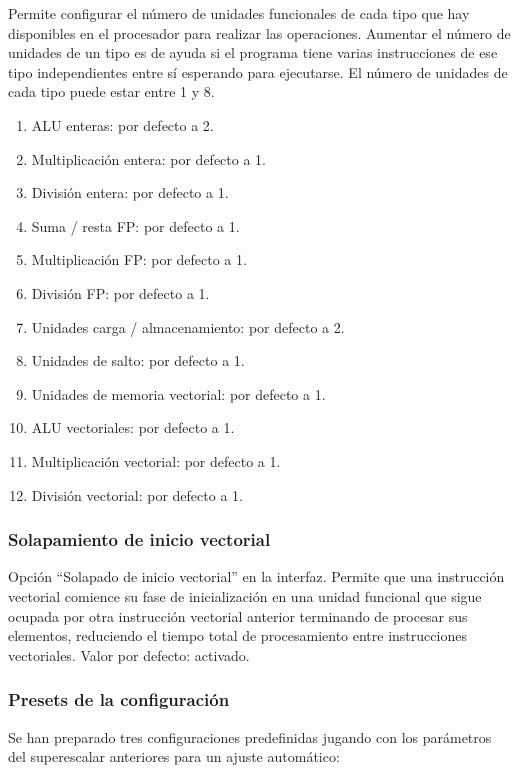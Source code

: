 \documentclass[../main.tex]{subfiles}
\begin{document}
Permite configurar el número de unidades funcionales de cada tipo que hay disponibles en el procesador para realizar las operaciones. Aumentar el número de unidades de un tipo es de ayuda si el programa tiene varias instrucciones de ese tipo independientes entre sí esperando para ejecutarse. El número de unidades de cada tipo puede estar entre 1 y 8.

\begin{enumerate}
	\item ALU enteras: por defecto a 2.
	\item Multiplicación entera: por defecto a 1.
	\item División entera: por defecto a 1.
	\item Suma / resta FP: por defecto a 1.
	\item Multiplicación FP: por defecto a 1.
	\item División FP: por defecto a 1.
	\item Unidades carga / almacenamiento: por defecto a 2.
	\item Unidades de salto: por defecto a 1.
	\item Unidades de memoria vectorial: por defecto a 1.
	\item ALU vectoriales: por defecto a 1.
	\item Multiplicación vectorial: por defecto a 1.
	\item División vectorial: por defecto a 1.
\end{enumerate}

\subsubsection*{Solapamiento de inicio vectorial}

Opción ``Solapado de inicio vectorial'' en la interfaz. Permite que una instrucción vectorial comience su fase de inicialización en una unidad funcional que sigue ocupada por otra instrucción vectorial anterior terminando de procesar sus elementos, reduciendo el tiempo total de procesamiento entre instrucciones vectoriales. Valor por defecto: activado.

\subsubsection*{Presets de la configuración}

Se han preparado tres configuraciones predefinidas jugando con los parámetros del superescalar anteriores para un ajuste automático:
\end{document}
